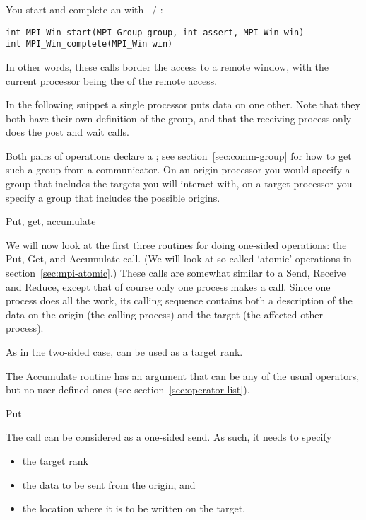 You start and complete an  with
~/ :
\begin{lstlisting}
int MPI_Win_start(MPI_Group group, int assert, MPI_Win win)
int MPI_Win_complete(MPI_Win win)
\end{lstlisting}
In other words, these calls border the access to a remote window, with the current processor
being the  of the remote access.

In the following snippet a single processor puts data on one
other. Note that they both have their own definition of the group, and
that the receiving process only does the post and wait calls.
%

Both pairs of operations declare a
; see section~\ref{sec:comm-group}
for how to get such a group from a communicator.
On an origin processor you would specify a group that includes the targets
you will interact with, on a target processor you specify a group
that includes the possible origins.

 {Put, get, accumulate}
\label{sec:putget}

We will now look at the first three routines for doing one-sided
operations: the Put, Get, and Accumulate call. (We will look at
so-called `atomic' operations in section~\ref{sec:mpi-atomic}.)
These calls are somewhat
similar to a Send, Receive and Reduce, except that of course only one
process makes a call.
Since one process does all the work, its calling sequence contains
both a description of the data on the origin (the calling process) and
the target (the affected other process).

As in the two-sided case,  can be used as
a target rank.

The Accumulate routine has an 
argument that can be any of the usual operators, but no
user-defined ones (see section~\ref{sec:operator-list}).

 {Put}
\label{sec:mpi-put}

The  call can be considered as a one-sided
send. As such, it needs to specify
\begin{itemize}
\item the target rank
\item the data to be sent from the origin, and
\item the location where it is to be written on the target.
\end{itemize}

